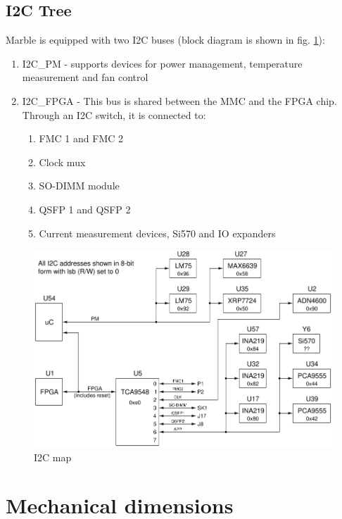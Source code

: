 \documentclass[12pt,oneside,a4]{article}
\begin{document}
\subsection{I2C Tree}
Marble is equipped with two I2C buses (block diagram is shown in fig. \ref{i2c}):
\begin{enumerate}
	\item I2C\_PM - supports devices for power management, temperature measurement and fan control
	\item I2C\_FPGA - This bus is shared between the MMC and the FPGA chip. Through an I2C switch, it is connected to:
	\begin{enumerate}
		\item FMC 1 and FMC 2
		\item Clock mux
		\item SO-DIMM module
		\item QSFP 1 and QSFP 2
		\item Current measurement devices, Si570 and IO expanders
	\end{enumerate}
\end{enumerate}
\begin{figure}[H]
\begin{center}
\includegraphics[width=1\linewidth]{marble2_i2c.png}
 \caption{I2C map}\label{i2c}
\end{center}
\end{figure}

\section{Mechanical dimensions}
\end{document}

